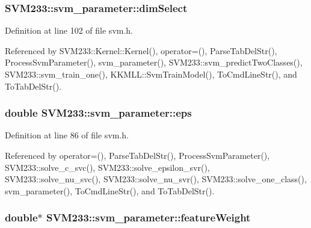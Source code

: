 \subsubsection[{\texorpdfstring{dim\+Select}{dimSelect}}]{ S\+V\+M233\+::svm\+\_\+parameter\+::dim\+Select}\hypertarget{struct_s_v_m233_1_1svm__parameter_a58954ba2ce4bb3cbc2c61ab9f7a31c69}{}\label{struct_s_v_m233_1_1svm__parameter_a58954ba2ce4bb3cbc2c61ab9f7a31c69}


Definition at line 102 of file svm.\+h.



Referenced by S\+V\+M233\+::\+Kernel\+::\+Kernel(), operator=(), Parse\+Tab\+Del\+Str(), Process\+Svm\+Parameter(), svm\+\_\+parameter(), S\+V\+M233\+::svm\+\_\+predict\+Two\+Classes(), S\+V\+M233\+::svm\+\_\+train\+\_\+one(), K\+K\+M\+L\+L\+::\+Svm\+Train\+Model(), To\+Cmd\+Line\+Str(), and To\+Tab\+Del\+Str().

\subsubsection[{\texorpdfstring{eps}{eps}}]{\setlength{\rightskip}{0pt plus 5cm}double S\+V\+M233\+::svm\+\_\+parameter\+::eps}\hypertarget{struct_s_v_m233_1_1svm__parameter_a0805c5f7c672e3a2c36a278d513b674f}{}\label{struct_s_v_m233_1_1svm__parameter_a0805c5f7c672e3a2c36a278d513b674f}


Definition at line 86 of file svm.\+h.



Referenced by operator=(), Parse\+Tab\+Del\+Str(), Process\+Svm\+Parameter(), S\+V\+M233\+::solve\+\_\+c\+\_\+svc(), S\+V\+M233\+::solve\+\_\+epsilon\+\_\+svr(), S\+V\+M233\+::solve\+\_\+nu\+\_\+svc(), S\+V\+M233\+::solve\+\_\+nu\+\_\+svr(), S\+V\+M233\+::solve\+\_\+one\+\_\+class(), svm\+\_\+parameter(), To\+Cmd\+Line\+Str(), and To\+Tab\+Del\+Str().

\subsubsection[{\texorpdfstring{feature\+Weight}{featureWeight}}]{\setlength{\rightskip}{0pt plus 5cm}double$\ast$ S\+V\+M233\+::svm\+\_\+parameter\+::feature\+Weight}\hypertarget{struct_s_v_m233_1_1svm__parameter_a1e602e5cf093a3e36d340957656b091b}{}\label{struct_s_v_m233_1_1svm__parameter_a1e602e5cf093a3e36d340957656b091b}


